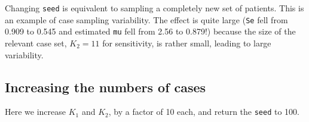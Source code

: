 \documentclass[
]{book}
\newenvironment{Shaded}{\begin{snugshade}}{\end{snugshade}}
\newcommand{\CharTok}[1]{\textcolor[rgb]{0.31,0.60,0.02}{#1}}
\newcommand{\CommentTok}[1]{\textcolor[rgb]{0.56,0.35,0.01}{\textit{#1}}}
\newcommand{\DecValTok}[1]{\textcolor[rgb]{0.00,0.00,0.81}{#1}}
\newcommand{\KeywordTok}[1]{\textcolor[rgb]{0.13,0.29,0.53}{\textbf{#1}}}
\newcommand{\NormalTok}[1]{#1}
\newcommand{\OperatorTok}[1]{\textcolor[rgb]{0.81,0.36,0.00}{\textbf{#1}}}
\newcommand{\StringTok}[1]{\textcolor[rgb]{0.31,0.60,0.02}{#1}}
\begin{document}
\begin{Shaded}
\end{Shaded}

Changing \texttt{seed} is equivalent to sampling a completely new set of patients. This is an example of case sampling variability. The effect is quite large (\texttt{Se} fell from 0.909 to 0.545 and estimated \texttt{mu} fell from 2.56 to 0.879!) because the size of the relevant case set, \(K_2=11\) for sensitivity, is rather small, leading to large variability.

\hypertarget{increasing-the-numbers-of-cases}{%
\subsection{Increasing the numbers of cases}\label{increasing-the-numbers-of-cases}}

Here we increase \(K_1\) and \(K_2\), by a factor of 10 each, and return the \texttt{seed} to 100.
\end{document}
